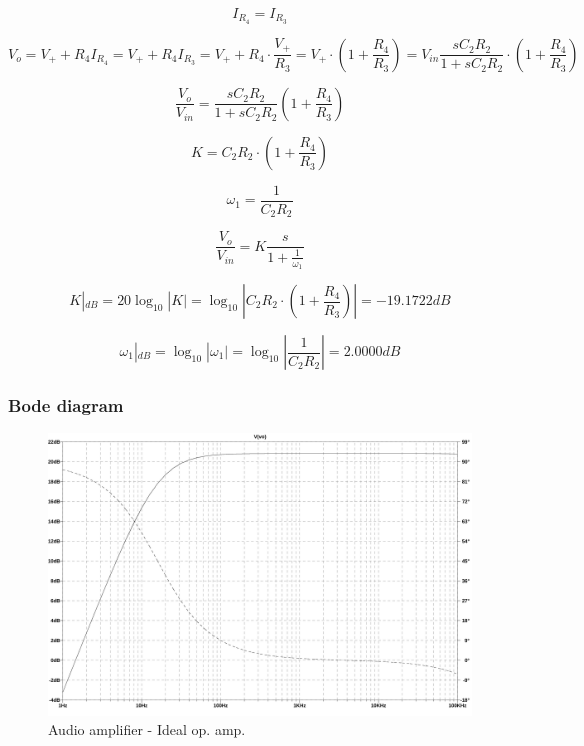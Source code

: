 \documentclass[10pt,a4paper]{article}
\begin{document}
\begin{equation} \label{eq:I_R4}
I_{R_4} = I_{R_3}
\end{equation}

\begin{equation} \label{eq:V_o}
V_o = V_+ + R_4I_{R_4} = V_+ + R_4 I_{R_3} = V_+ + R_4 \cdot \frac{V_+}{R_3} =
V_+ \cdot \left(1 + \frac{R_4}{R_3} \right) =
V_{in}\frac{sC_2R_2}{1+sC_2R_2} \cdot \left(1 + \frac{R_4}{R_3} \right)
\end{equation}

\begin{equation} \label{eq:TF}
\frac{V_o}{V_{in}} = \frac{sC_2R_2}{1+sC_2R_2}\left(1+\frac{R_4}{R_3}\right)
\end{equation}

\begin{equation} \label{eq:K}
K = C_2R_2 \cdot \left(1+\frac{R_4}{R_3}\right)
\end{equation}

\begin{equation} \label{eq:omega_1}
 \omega_1 = \frac{1}{C_2R_2}
\end{equation}

\begin{equation} \label{eq:TFBode}
\frac{V_o}{V_{in}} = K \frac{s}{1+\frac{1}{\omega_1}}
\end{equation}

\begin{equation} \label{eq:KdB}
 K|_{dB} = 20\log_{10}|K| = \log_{10}\left|C_2R_2 \cdot \left(1+\frac{R_4}{R_3}\right)\right| = -19.1722 dB
\end{equation}

\begin{equation} \label{eq:omega_1dB}
\omega_1|_{dB} = \log_{10} |\omega_1| = \log_{10} \left| \frac{1}{C_2R_2} \right|= 2.0000dB
\end{equation}

\subsubsection{Bode diagram}
\begin{figure}[h]
  \centering
  \includegraphics[width=14cm]{graph/1d1.jpg}
  \caption{Audio amplifier - Ideal op. amp.}
  \label{1d1graph}
\end{figure}
\end{document}
